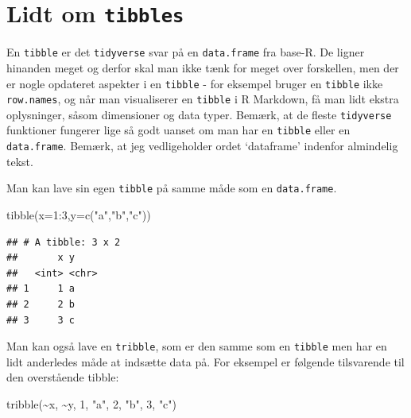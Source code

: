 \documentclass[
]{book}
\newenvironment{Shaded}{\begin{snugshade}}{\end{snugshade}}
\newcommand{\AttributeTok}[1]{\textcolor[rgb]{0.77,0.63,0.00}{#1}}
\newcommand{\DecValTok}[1]{\textcolor[rgb]{0.00,0.00,0.81}{#1}}
\newcommand{\FunctionTok}[1]{\textcolor[rgb]{0.00,0.00,0.00}{#1}}
\newcommand{\NormalTok}[1]{#1}
\newcommand{\SpecialCharTok}[1]{\textcolor[rgb]{0.00,0.00,0.00}{#1}}
\newcommand{\StringTok}[1]{\textcolor[rgb]{0.31,0.60,0.02}{#1}}
\begin{document}
\hypertarget{lidt-om-tibbles}{%
\section{\texorpdfstring{Lidt om \texttt{tibbles}}{Lidt om tibbles}}\label{lidt-om-tibbles}}

En \texttt{tibble} er det \texttt{tidyverse} svar på en \texttt{data.frame} fra base-R. De ligner hinanden meget og derfor skal man ikke tænk for meget over forskellen, men der er nogle opdateret aspekter i en \texttt{tibble} - for eksempel bruger en \texttt{tibble} ikke \texttt{row.names}, og når man visualiserer en \texttt{tibble} i R Markdown, få man lidt ekstra oplysninger, såsom dimensioner og data typer. Bemærk, at de fleste \texttt{tidyverse} funktioner fungerer lige så godt uanset om man har en \texttt{tibble} eller en \texttt{data.frame}. Bemærk, at jeg vedligeholder ordet `dataframe' indenfor almindelig tekst.

Man kan lave sin egen \texttt{tibble} på samme måde som en \texttt{data.frame}.

\begin{Shaded}
\begin{Highlighting}[]
\FunctionTok{tibble}\NormalTok{(}\AttributeTok{x=}\DecValTok{1}\SpecialCharTok{:}\DecValTok{3}\NormalTok{,}\AttributeTok{y=}\FunctionTok{c}\NormalTok{(}\StringTok{"a"}\NormalTok{,}\StringTok{"b"}\NormalTok{,}\StringTok{"c"}\NormalTok{))}
\end{Highlighting}
\end{Shaded}

\begin{verbatim}
## # A tibble: 3 x 2
##       x y    
##   <int> <chr>
## 1     1 a    
## 2     2 b    
## 3     3 c
\end{verbatim}

Man kan også lave en \texttt{tribble}, som er den samme som en \texttt{tibble} men har en lidt anderledes måde at indsætte data på. For eksempel er følgende tilsvarende til den overstående tibble:

\begin{Shaded}
\begin{Highlighting}[]
\FunctionTok{tribble}\NormalTok{(}\SpecialCharTok{\textasciitilde{}}\NormalTok{x, }\SpecialCharTok{\textasciitilde{}}\NormalTok{y,}
       \DecValTok{1}\NormalTok{, }\StringTok{"a"}\NormalTok{,}
       \DecValTok{2}\NormalTok{, }\StringTok{"b"}\NormalTok{,}
       \DecValTok{3}\NormalTok{, }\StringTok{"c"}\NormalTok{)}
\end{Highlighting}
\end{Shaded}
\end{document}
